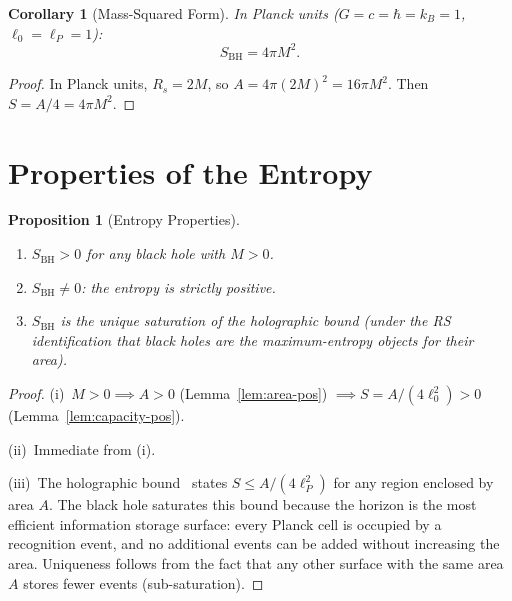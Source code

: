 \documentclass[12pt,a4paper]{article}
\newtheorem{corollary}[theorem]{Corollary}
\newtheorem{proposition}[theorem]{Proposition}
\theoremstyle{definition}
\theoremstyle{remark}
\begin{document}
\begin{corollary}[Mass-Squared Form]
\label{cor:mass-squared}
In Planck units ($G = c = \hbar = k_B = 1$, $\ell_0 = \ell_P = 1$):
\begin{equation}
  S_{\mathrm{BH}} = 4\pi M^2.
  \label{eq:mass-squared}
\end{equation}
\end{corollary}

\begin{proof}
In Planck units, $R_s = 2M$, so $A = 4\pi(2M)^2 = 16\pi M^2$.
Then $S = A/4 = 4\pi M^2$.
\end{proof}

\section{Properties of the Entropy}
\label{sec:properties}

\begin{proposition}[Entropy Properties]
\label{thm:properties}
\begin{enumerate}[label=(\roman*)]
  \item $S_{\mathrm{BH}} > 0$ for any black hole with
  $M > 0$.
  \item $S_{\mathrm{BH}} \neq 0$: the entropy is
  strictly positive.
  \item $S_{\mathrm{BH}}$ is the unique saturation of
  the holographic bound (under the RS identification that black
  holes are the maximum-entropy objects for their area).
\end{enumerate}
\end{proposition}

\begin{proof}
(i)~$M > 0 \implies A > 0$ (Lemma~\ref{lem:area-pos})
$\implies S = A/(4\ell_0^2) > 0$
(Lemma~\ref{lem:capacity-pos}).

(ii)~Immediate from (i).

(iii)~The holographic bound~\cite{Bousso2002} states
$S \leq A/(4\ell_P^2)$ for any region enclosed by area
$A$.  The black hole saturates this bound because the
horizon is the most efficient information storage surface:
every Planck cell is occupied by a recognition event, and
no additional events can be added without increasing the
area.  Uniqueness follows from the fact that any other
surface with the same area $A$ stores fewer events
(sub-saturation).
\end{proof}
\end{document}
